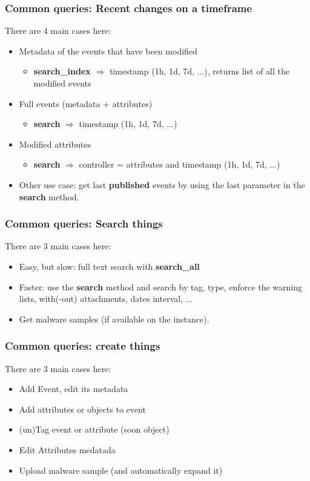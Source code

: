 \begin{frame}
    \frametitle{Common queries: Recent changes on a timeframe}
    There are 4 main cases here:
    \begin{itemize}
        \item Metadata of the events that have been modified
        \begin{itemize}
            \item {\bf search\_index} $\Rightarrow$ timestamp (1h, 1d, 7d, ...), returns list of all the modified events
        \end{itemize}
        \item Full events (metadata + attributes)
        \begin{itemize}
            \item {\bf search} $\Rightarrow$ timestamp (1h, 1d, 7d, ...)
        \end{itemize}
        \item Modified attributes
        \begin{itemize}
            \item {\bf search} $\Rightarrow$ controller = attributes and timestamp (1h, 1d, 7d, ...)
        \end{itemize}
        \item Other use case: get last {\bf published} events by using the last parameter in the {\bf search} method.
    \end{itemize}
\end{frame}

\begin{frame}
    \frametitle{Common queries: Search things}
    There are 3 main cases here:
    \begin{itemize}
        \item Easy, but slow: full text search with {\bf search\_all}
        \item Faster: use the {\bf search} method and search by tag, type, enforce the warning lists, with(-out) attachments, dates interval, ...
        \item Get malware samples (if available on the instance).
    \end{itemize}
\end{frame}

\begin{frame}
    \frametitle{Common queries: create things}
    There are 3 main cases here:
    \begin{itemize}
        \item Add Event, edit its metadata
        \item Add attributes or objects to event
        \item (un)Tag event or attribute (soon object)
        \item Edit Attributes medatada
        \item Upload malware sample (and automatically expand it)
    \end{itemize}
\end{frame}

